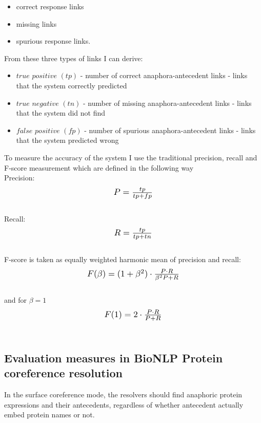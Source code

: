 \begin{itemize}
  \item correct response links
  \item missing links
  \item spurious response links.
\end{itemize}
From these three types of links I can derive:
\begin{itemize}	
 \item $true$ $positive$ $(tp)$ - number of  correct anaphora-antecedent links - links that the system correctly predicted\\
 \item $true$ $negative$ $(tn)$ - number of missing anaphora-antecedent links - links that the system did not find\\
 \item $false$ $positive$ $(fp)$ - number of spurious anaphora-antecedent links - links that the system predicted wrong \\
\end{itemize}
To measure the accuracy of the system I use the traditional  precision, recall and F-score  measurement which are defined in the following way\\
\hspace{2cm}  Precision: \hspace{1cm}\\
\hspace{4cm}\[ \scalebox{1.2} {$P =\frac{tp}{tp+fp}$}\] \\
\hspace{2cm} Recall: \\
\hspace{4cm} \[ \scalebox{1.2} {$R=\frac{tp}{tp+tn}$}\] \\
F-score is taken as equally weighted harmonic mean of precision and recall:\\
\[ \scalebox{1.2} {$F(\beta)=(1+\beta^2)\cdot \frac{P\cdot R}{\beta^2P+R}$}\] \\
 and for $\beta=1$ \\
\[ \scalebox{1.2} {$F(1)=2\cdot \frac{P \cdot R}{P+R}$}\]\\
\subsection{Evaluation measures in BioNLP Protein coreference resolution}

In the surface coreference mode, the resolvers should find anaphoric protein expressions and their antecedents, regardless of whether antecedent actually embed protein names or not. 

